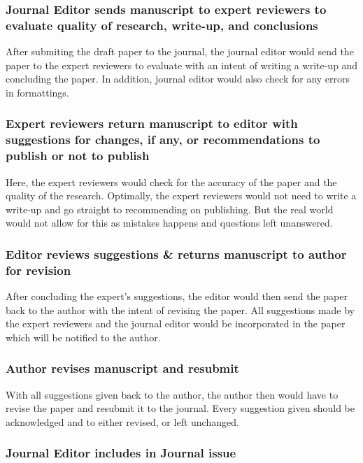 \documentclass[
  11pt, %
]{assignment}
\begin{document}
\subsubsection*{Journal Editor sends manuscript to expert reviewers to evaluate quality of research, write-up, and conclusions}

After submiting the draft paper to the journal, the journal editor would send the paper to the expert reviewers to evaluate with an intent of writing a write-up and concluding the paper. In addition, journal editor would also check for any errors in formattings.

\subsubsection*{Expert reviewers return manuscript to editor with suggestions for changes, if any, or recommendations to publish or not to publish}

Here, the expert reviewers would check for the accuracy of the paper and the quality of the research. Optimally, the expert reviewers would not need to write a write-up and go straight to recommending on publishing. But the real world would not allow for this as mistakes happens and questions left unanswered.

\subsubsection*{Editor reviews suggestions \& returns manuscript to author for revision}

After concluding the expert's suggestions, the editor would then send the paper back to the author with the intent of revising the paper. All suggestions made by the expert reviewers and the journal editor would be incorporated in the paper which will be notified to the author.

\subsubsection*{Author revises manuscript and resubmit}

With all suggestions given back to the author, the author then would have to revise the paper and resubmit it to the journal. Every suggestion given should be acknowledged and to either revised, or left unchanged.

\subsubsection*{Journal Editor includes in Journal issue}
\end{document}
